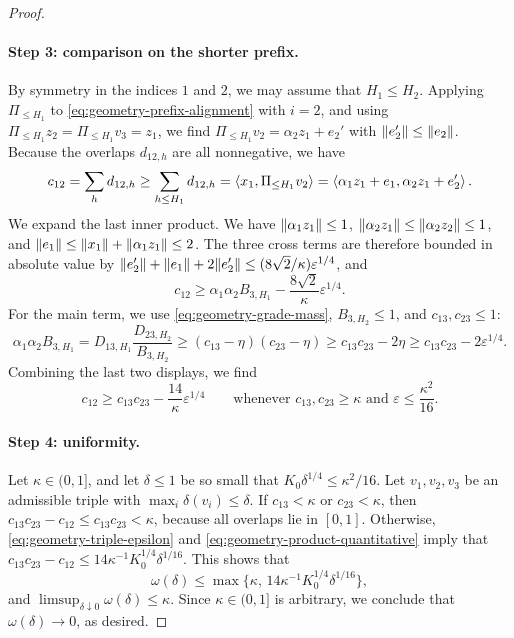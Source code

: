 \begin{proof}
\paragraph{Step 3: comparison on the shorter prefix.}
By symmetry in the indices $1$ and $2$, we may assume that $H_1\le H_2$. Applying $\Pi_{\le H_1}$ to \eqref{eq:geometry-prefix-alignment} with $i=2$, and using $\Pi_{\le H_1}z_2=\Pi_{\le H_1}v_3=z_1$, we find $\Pi_{\le H_1}v_2=\alpha_2z_1+e_2'$ with $\lVert e_2'\rVert\le\lVert e_2\rVert$. Because the overlaps $d_{12,h}$ are all nonnegative, we have
\[
 c_{12}=\sum_hd_{12,h}\ge\sum_{h\le H_1}d_{12,h}=\left\langle x_1,\Pi_{\le H_1}v_2\right\rangle
 =\left\langle\alpha_1z_1+e_1,\alpha_2z_1+e_2'\right\rangle .
\]
We expand the last inner product. We have $\lVert\alpha_1z_1\rVert\le1$, $\lVert\alpha_2z_1\rVert\le\lVert\alpha_2z_2\rVert\le1$, and $\lVert e_1\rVert\le\lVert x_1\rVert+\lVert\alpha_1z_1\rVert\le2$. The three cross terms are therefore bounded in absolute value by $\lVert e_2'\rVert+\lVert e_1\rVert+2\lVert e_2'\rVert\le(8\sqrt2/\kappa)\varepsilon^{1/4}$, and
\[
 c_{12}\ge\alpha_1\alpha_2B_{3,H_1}-\frac{8\sqrt2}{\kappa}\varepsilon^{1/4} .
\]
For the main term, we use \eqref{eq:geometry-grade-mass}, $B_{3,H_2}\le1$, and $c_{13},c_{23}\le1$:
\[
 \alpha_1\alpha_2B_{3,H_1}=D_{13,H_1}\frac{D_{23,H_2}}{B_{3,H_2}}
 \ge(c_{13}-\eta)(c_{23}-\eta)\ge c_{13}c_{23}-2\eta\ge c_{13}c_{23}-2\varepsilon^{1/4}.
\]
Combining the last two displays, we find
\begin{equation}\label{eq:geometry-product-quantitative}
 c_{12}\ge c_{13}c_{23}-\frac{14}{\kappa}\varepsilon^{1/4}
 \qquad\text{whenever } c_{13},c_{23}\ge\kappa\text{ and }\varepsilon\le\frac{\kappa^2}{16} .
\end{equation}

\paragraph{Step 4: uniformity.}
Let $\kappa\in(0,1]$, and let $\delta\le1$ be so small that $K_0\delta^{1/4}\le\kappa^2/16$. Let $v_1,v_2,v_3$ be an admissible triple with $\max_i\delta(v_i)\le\delta$. If $c_{13}<\kappa$ or $c_{23}<\kappa$, then $c_{13}c_{23}-c_{12}\le c_{13}c_{23}<\kappa$, because all overlaps lie in $[0,1]$. Otherwise, \eqref{eq:geometry-triple-epsilon} and \eqref{eq:geometry-product-quantitative} imply that $c_{13}c_{23}-c_{12}\le14\kappa^{-1}K_0^{1/4}\delta^{1/16}$. This shows that
\[
 \omega(\delta)\le\max\bigl\{\kappa,\,14\kappa^{-1}K_0^{1/4}\delta^{1/16}\bigr\},
\]
and $\limsup_{\delta\downarrow0}\omega(\delta)\le\kappa$. Since $\kappa\in(0,1]$ is arbitrary, we conclude that $\omega(\delta)\to0$, as desired.
\end{proof}
